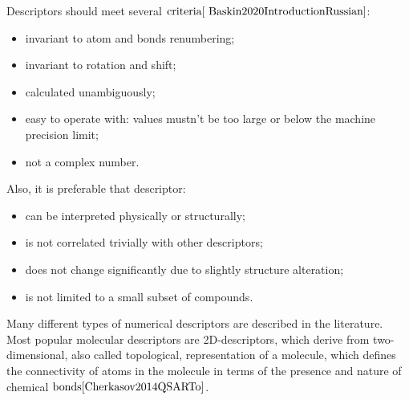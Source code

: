 \noindent Descriptors should meet several $\text{criteria}{\cite{
Baskin2020IntroductionRussian}}$:
\begin{itemize}
    \item invariant to atom and bonds renumbering;
    \item invariant to rotation and shift;
    \item calculated unambiguously;
    \item easy to operate with: values mustn't be too large or below the machine precision limit;
    \item not a complex number.
\end{itemize}
\hfill\break
Also, it is preferable that descriptor:
\begin{itemize}
    \item can be interpreted physically or structurally;
    \item is not correlated trivially with other descriptors;
    \item does not change significantly due to slightly structure alteration;
    \item is not limited to a small subset of compounds.
\end{itemize}

\noindent Many different types of numerical descriptors are described in the literature. 
Most popular molecular descriptors are 2D-descriptors, which derive from two-dimensional, 
also called topological, representation of a molecule, which defines the connectivity 
of atoms in the molecule in terms of the presence and nature of chemical $\text{bonds}{\cite{Cherkasov2014QSARTo}}$. 


